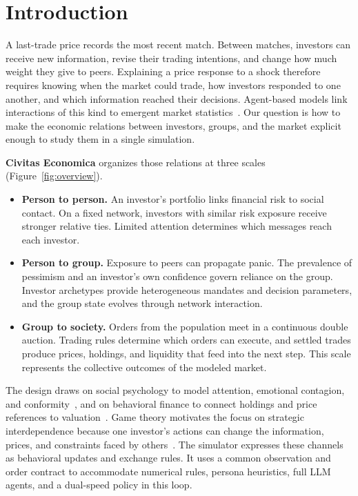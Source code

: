 \section{Introduction}
\label{sec:introduction}

A last-trade price records the most recent match. Between matches, investors can receive new information, revise their trading intentions, and change how much weight they give to peers. Explaining a price response to a shock therefore requires knowing when the market could trade, how investors responded to one another, and which information reached their decisions. Agent-based models link interactions of this kind to emergent market statistics~\cite{cont2001empirical,lebaron2006agent,farmer2009economy,lux1999scaling}. Our question is how to make the economic relations between investors, groups, and the market explicit enough to study them in a single simulation.

\textbf{Civitas Economica} organizes those relations at three scales (Figure~\ref{fig:overview}).
\begin{itemize}[leftmargin=*,itemsep=2pt]
 \item \textbf{Person to person.} An investor's portfolio links financial risk to social contact. On a fixed network, investors with similar risk exposure receive stronger relative ties. Limited attention determines which messages reach each investor.
 \item \textbf{Person to group.} Exposure to peers can propagate panic. The prevalence of pessimism and an investor's own confidence govern reliance on the group. Investor archetypes provide heterogeneous mandates and decision parameters, and the group state evolves through network interaction.
 \item \textbf{Group to society.} Orders from the population meet in a continuous double auction. Trading rules determine which orders can execute, and settled trades produce prices, holdings, and liquidity that feed into the next step. This scale represents the collective outcomes of the modeled market.
\end{itemize}

The design draws on social psychology to model attention, emotional contagion, and conformity~\cite{deutsch1955study,hatfield1993emotional,tajfel1979integrative}, and on behavioral finance to connect holdings and price references to valuation~\cite{kahneman1979prospect,tversky1992advances}. Game theory motivates the focus on strategic interdependence because one investor's actions can change the information, prices, and constraints faced by others~\cite{cooper1988coordinating,keynes1936general,morris2002social}. The simulator expresses these channels as behavioral updates and exchange rules. It uses a common observation and order contract to accommodate numerical rules, persona heuristics, full LLM agents, and a dual-speed policy in this loop.

